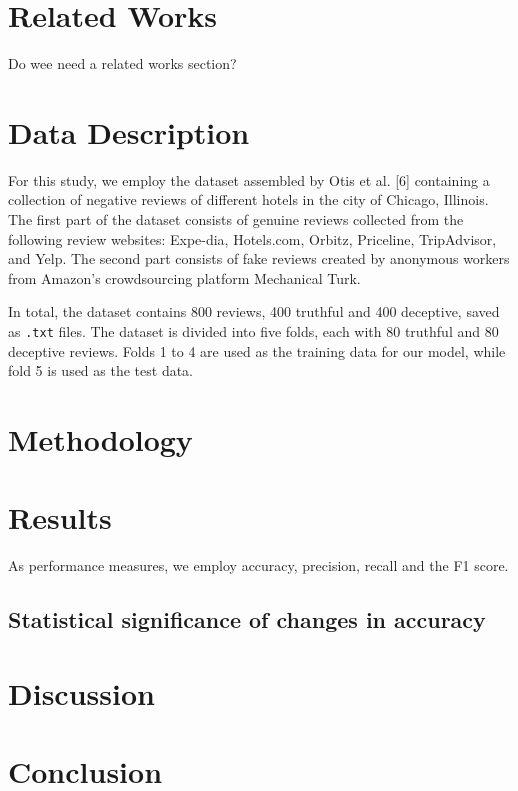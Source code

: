 \documentclass[a4paper,11pt]{article}
\begin{document}
\section{Related Works}
Do wee need a related works section?

\section{Data Description}

For this study, we employ the dataset assembled by Otis et al. [6] containing a collection of negative reviews of different hotels in the city of Chicago, Illinois. The first part of the dataset consists of genuine reviews collected from the following review websites: Expe-dia, Hotels.com, Orbitz, Priceline, TripAdvisor, and Yelp. The second part consists of fake reviews created by anonymous workers from Amazon's crowdsourcing platform Mechanical Turk.   

In total, the dataset contains 800 reviews, 400 truthful and 400 deceptive, saved as \texttt{.txt} files. The dataset is divided into five folds, each with 80 truthful and 80 deceptive reviews. Folds 1 to 4 are used as the training data for our model, while fold 5 is used as the test data. 



\section{Methodology}


\section{Results}

As performance measures, we employ accuracy, precision, recall and the F1 score.

\subsection{Statistical significance of changes in accuracy}


\section{Discussion}

\section{Conclusion}
\end{document}
